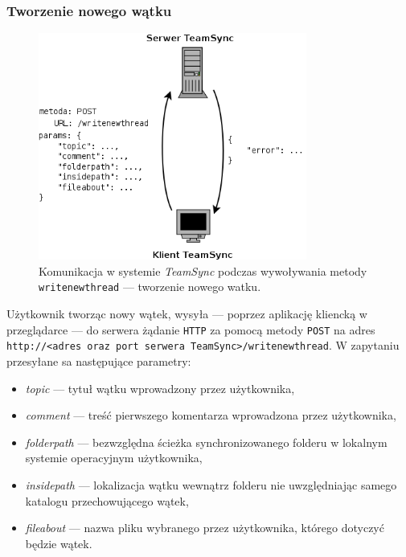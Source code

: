 \subsubsection*{Tworzenie nowego wątku}

\begin{figure}[h!]
  \vspace{5pt}
  \begin{center}
    \includegraphics[width=250pt]{figures/metwritenewthread.png}
  \end{center}
  \caption{Komunikacja w systemie \emph{TeamSync} podczas wywoływania metody \texttt{writenewthread} --- tworzenie nowego watku.}
  \label{picmetdeletefolder}
\end{figure}

Użytkownik tworząc nowy wątek, wysyła --- poprzez aplikację kliencką w przeglądarce --- do serwera żądanie \texttt{HTTP} za pomocą metody \texttt{POST} na adres \texttt{http://<adres oraz port\- serwera TeamSync>/\-writenewthread}. W zapytaniu przesyłane sa następujące parametry:

\begin{itemize}[noitemsep]
  \item \emph{topic} --- tytuł wątku wprowadzony przez użytkownika,
  
  \item \emph{comment} --- treść pierwszego komentarza wprowadzona przez użytkownika,
  
  \item \emph{folderpath} --- bezwzględna ścieżka synchronizowanego folderu w lokalnym systemie operacyjnym użytkownika,
  
  \item \emph{insidepath} --- lokalizacja wątku wewnątrz folderu nie uwzględniając samego katalogu przechowującego wątek,
  
  \item \emph{fileabout} --- nazwa pliku wybranego przez użytkownika, którego dotyczyć będzie wątek.
\end{itemize}

